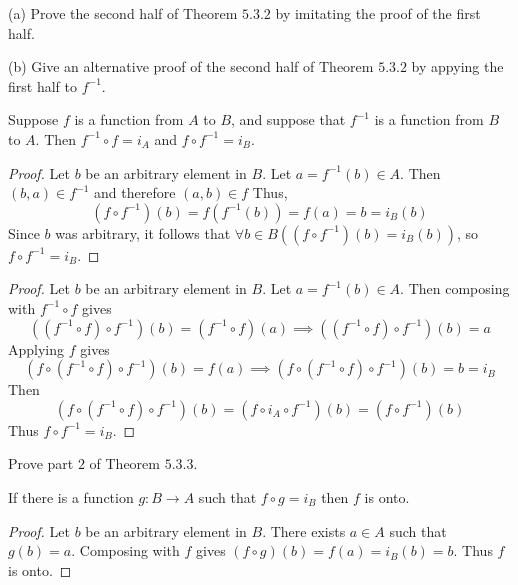 \begin{tcolorbox}[title=Problem 8, breakable]
    (a) Prove the second half of Theorem $5.3.2$ by imitating the proof of the first half.

    (b) Give an alternative proof of the second half of Theorem $5.3.2$ by appying the 
        first half to $f^{-1}$.
\end{tcolorbox}

\begin{theorem}[$5.3.2$]
    Suppose $f$ is a function from $A$ to $B$, and suppose that $f^{-1}$
        is a function from $B$ to $A$. Then $f^{-1} \circ f = i_A$ and $f \circ f^{-1} = i_B$.
\end{theorem}

\begin{proof}
    Let $b$ be an arbitrary element in $B$.
    Let $a = f^{-1}(b) \in A$.
    Then $(b, a) \in f^{-1}$ and therefore $(a, b) \in f$
    Thus,
    \[(f \circ f^{-1})(b) = f(f^{-1}(b)) = f(a) = b = i_B(b)\]
    Since $b$ was arbitrary, it follows that $\forall{b \in B}((f \circ f^{-1})(b) = i_B(b))$,
        so $f \circ f^{-1} = i_B$. 
\end{proof}

\begin{proof}
    Let $b$ be an arbitrary element in $B$.
    Let $a = f^{-1}(b) \in A$.
    Then composing with $f^{-1} \circ f$ 
        gives 
    \[((f^{-1} \circ f) \circ f^{-1})(b) = (f^{-1} \circ f)(a)
                \implies ((f^{-1} \circ f) \circ f^{-1})(b) = a\]
    Applying $f$ gives 
    \[(f \circ (f^{-1} \circ f) \circ f^{-1})(b) = f(a)
        \implies (f \circ (f^{-1} \circ f) \circ f^{-1})(b) = b = i_B\]
    Then 
    \[(f \circ (f^{-1} \circ f) \circ f^{-1})(b) = (f \circ i_A \circ f^{-1})(b) = (f \circ f^{-1})(b)\]
    Thus $f \circ f^{-1} = i_B$.
\end{proof}

\begin{tcolorbox}[title=Problem 9, breakable]
    Prove part $2$ of Theorem $5.3.3$.
\end{tcolorbox}

\begin{theorem}[Part $2$, $5.3.3$]
    If there is a function $g : B \rightarrow A$ such that $f \circ g = i_B$
        then $f$ is onto.
\end{theorem}

\begin{proof}
    Let $b$ be an arbitrary element in $B$.
    There exists $a \in A$ such that $g(b) = a$.
    Composing with $f$ gives $(f \circ g)(b) = f(a) = i_B(b) = b$.
    Thus $f$ is onto.
\end{proof}

